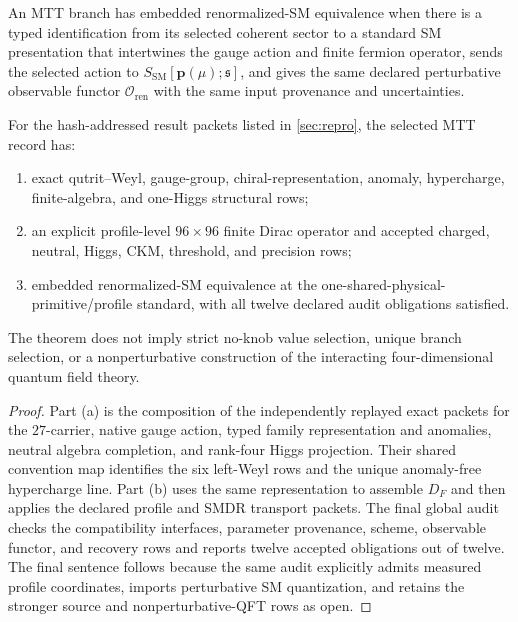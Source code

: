\documentclass[11pt]{article}
\newcommand{\cO}{\mathcal{O}}
\newcommand{\SM}{\mathrm{SM}}
\begin{document}
\begin{definition}
An MTT branch has embedded renormalized-SM equivalence when there is a typed identification from
its selected coherent sector to a standard SM presentation that intertwines the gauge action and
finite fermion operator, sends the selected action to
$S_{\SM}[\mathbf p(\mu);\mathfrak s]$, and gives the same declared perturbative observable
functor $\cO_{\mathrm{ren}}$ with the same input provenance and uncertainties.
\end{definition}

\begin{theorem}
For the hash-addressed result packets listed in \cref{sec:repro}, the selected MTT record has:
\begin{enumerate}[label=(\alph*)]
\item exact qutrit--Weyl, gauge-group, chiral-representation, anomaly, hypercharge, finite-algebra,
and one-Higgs structural rows;
\item an explicit profile-level $96\times96$ finite Dirac operator and accepted charged, neutral,
Higgs, CKM, threshold, and precision rows;
\item embedded renormalized-SM equivalence at the one-shared-physical-primitive/profile standard,
with all twelve declared audit obligations satisfied.
\end{enumerate}
The theorem does not imply strict no-knob value selection, unique branch selection, or a
nonperturbative construction of the interacting four-dimensional quantum field theory.
\end{theorem}

\begin{proof}
Part (a) is the composition of the independently replayed exact packets for the $27$-carrier,
native gauge action, typed family representation and anomalies, neutral algebra completion, and
rank-four Higgs projection.  Their shared convention map identifies the six left-Weyl rows and
the unique anomaly-free hypercharge line.  Part (b) uses the same representation to assemble
$D_F$ and then applies the declared profile and SMDR transport packets.  The final global audit
checks the compatibility interfaces, parameter provenance, scheme, observable functor, and
recovery rows and reports twelve accepted obligations out of twelve.  The final sentence follows
because the same audit explicitly admits measured profile coordinates, imports perturbative SM
quantization, and retains the stronger source and nonperturbative-QFT rows as open.
\end{proof}
\end{document}
